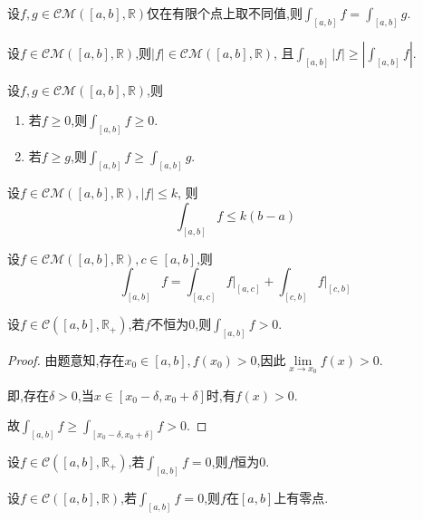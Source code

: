 \begin{prop}
    设$f,g\in\mathcal{CM}([a,b],\mathbb{R})$仅在有限个点上取不同值,则$\int_{[a,b]}f=\int_{[a,b]}g$.
\end{prop}

\begin{prop}
    设$f\in\mathcal{CM}([a,b],\mathbb{R})$,则$\left\lvert f \right\rvert \in\mathcal{CM}([a,b],\mathbb{R})$,
    且$\int_{[a,b]} \left\lvert f \right\rvert \geqslant \left\lvert \int_{[a,b]}f \right\rvert$.
\end{prop}

\begin{prop}
    设$f,g\in\mathcal{CM}([a,b],\mathbb{R})$,则
    \begin{enumerate}
        \item 若$f\geqslant0$,则$\int_{[a,b]}f\geqslant0$.
        \item 若$f \geqslant g$,则$\int_{[a,b]}f \geqslant \int_{[a,b]}g$.
    \end{enumerate}
\end{prop}

\begin{prop}
    设$f\in\mathcal{CM}([a,b],\mathbb{R}),\left\lvert f \right\rvert \leqslant k$,
    则\[ \int_{[a,b]}f\leqslant k(b-a) \]
\end{prop}

\begin{prop}
    设$f\in\mathcal{CM}([a,b],\mathbb{R}),c\in[a,b]$,则
    \[ \int_{[a,b]}f=\int_{[a,c]}f\vert_{[a,c]}+\int_{[c,b]}f\vert_{[c,b]} \]
\end{prop}

\begin{thm}
    设$f\in\mathcal{C}([a,b],\mathbb{R}_+)$,若$f$不恒为0,则$\int_{[a,b]}f>0$.
\end{thm}

\begin{proof}
    由题意知,存在$x_0\in[a,b],f(x_0)>0$,因此$\lim\limits_{x\to x_0}f(x)>0$.

    即,存在$\delta>0$,当$x\in[x_0-\delta,x_0+\delta]$时,有$f(x)>0$.

    故$\int_{[a,b]}f\geqslant\int_{[x_0-\delta,x_0+\delta]}f>0$.
\end{proof}

\begin{cor}
    设$f\in\mathcal{C}([a,b],\mathbb{R}_+)$,若$\int_{[a,b]}f=0$,则$f$恒为0.
\end{cor}

\begin{prop}
    设$f\in\mathcal{C}([a,b],\mathbb{R})$,若$\int_{[a,b]}f=0$,则$f$在$[a,b]$上有零点.
\end{prop}

